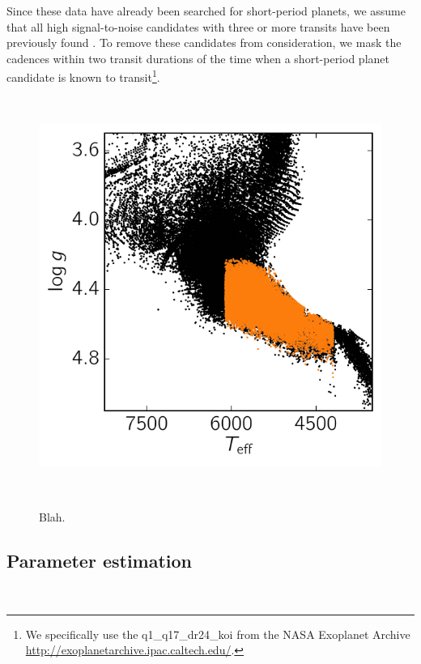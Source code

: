 \documentclass[manuscript, letterpaper]{aastex6}
\newcommand{\dfmfiglabel}[1]{\label{fig:#1}}
\begin{document}
Since these data have already been searched for short-period planets, we
assume that all high signal-to-noise candidates with three or more transits
have been previously found \citep{Coughlin:2016}.
To remove these candidates from consideration, we mask the cadences within two
transit durations of the time when a short-period planet candidate is known to
transit\footnote{We specifically use the \textsf{q1\_q17\_dr24\_koi} from the
NASA Exoplanet Archive \url{http://exoplanetarchive.ipac.caltech.edu/}.}.

\begin{figure}~\\
\begin{center}
\includegraphics{figures/targets.pdf}
\end{center}
\caption{%
Blah.
\dfmfiglabel{targets}}~\\
\end{figure}


\subsection{Parameter estimation}

\begin{figure}[p]~\\
\begin{center}

\end{center}
\caption{%
\dfmfiglabel{lightcurves}}
\end{figure}
\end{document}
